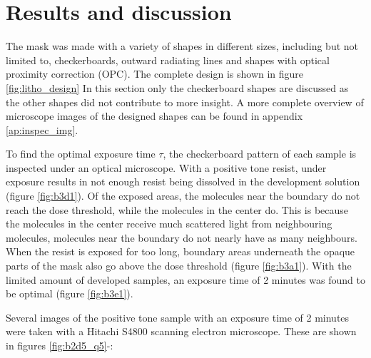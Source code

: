 \section*{Results and discussion}
The mask was made with a variety of shapes in different sizes, including but not limited to, checkerboards, outward radiating lines and shapes with optical proximity correction (OPC). The complete design is shown in figure \ref{fig:litho_design} In this section only the checkerboard shapes are discussed as the other shapes did not contribute to more insight. A more complete overview of microscope images of the designed shapes can be found in appendix \ref{ap:inspec_img}.

To find the optimal exposure time $\tau$, the checkerboard pattern of each sample is inspected under an optical microscope. With a positive tone resist, under exposure results in not enough resist being dissolved in the development solution (figure \ref{fig:b3d1}). Of the exposed areas, the molecules near the boundary do not reach the dose threshold, while the molecules in the center do. This is because the molecules in the center receive much scattered light from neighbouring molecules, molecules near the boundary do not nearly have as many neighbours. When the resist is exposed for too long, boundary areas underneath the opaque parts of the mask also go above the dose threshold (figure \ref{fig:b3a1}). With the limited amount of developed samples, an exposure time of 2 minutes was found to be optimal (figure \ref{fig:b3e1}). 

Several images of the positive tone sample with an exposure time of 2 minutes were taken with a Hitachi S4800 scanning electron microscope. These are shown in figures \ref{fig:b2d5_q5}-:

